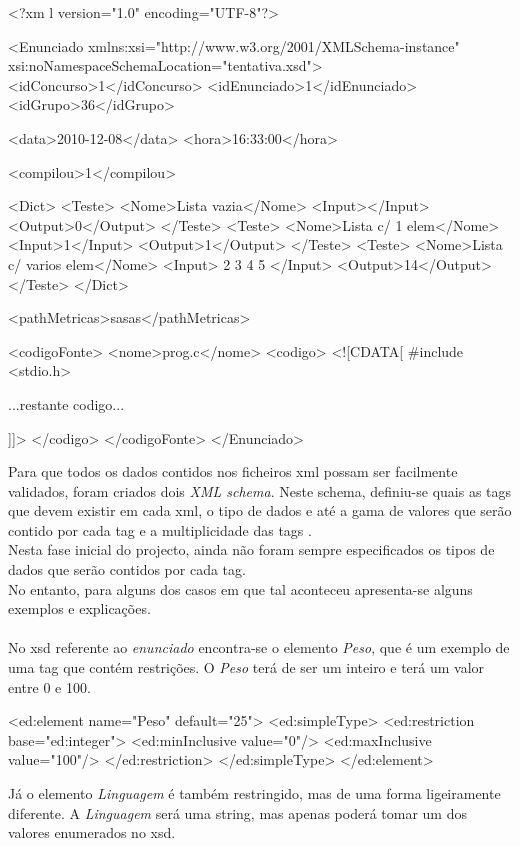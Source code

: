 \begin{myxml}
<?xm l version="1.0" encoding="UTF-8"?>

<Enunciado xmlns:xsi="http://www.w3.org/2001/XMLSchema-instance"
    xsi:noNamespaceSchemaLocation="tentativa.xsd">
    <idConcurso>1</idConcurso>
    <idEnunciado>1</idEnunciado>
    <idGrupo>36</idGrupo>
    
    <data>2010-12-08</data>
    <hora>16:33:00</hora>
    
    <compilou>1</compilou>
    
    <Dict>
        <Teste>
            <Nome>Lista vazia</Nome>
            <Input></Input>
            <Output>0</Output>
        </Teste>
        <Teste>
            <Nome>Lista c/ 1 elem</Nome>
            <Input>1</Input>
            <Output>1</Output>
        </Teste>
        <Teste>
            <Nome>Lista c/ varios elem</Nome>
            <Input> 2 3 4 5 </Input>
            <Output>14</Output>
        </Teste>
    </Dict>

    <pathMetricas>sasas</pathMetricas>
    
    <codigoFonte>
        <nome>prog.c</nome>
        <codigo>
            <![CDATA[
            #include <stdio.h>
            
            ...restante codigo...
            
            ]]>
        </codigo>
    </codigoFonte>
</Enunciado>
\end{myxml}


Para que todos os dados contidos nos ficheiros xml possam ser facilmente validados, foram criados dois \textit{XML schema}.
Neste schema, definiu-se quais as tags que devem existir em cada xml, o tipo de dados e até a gama de valores que serão contido por cada tag e
 a multiplicidade das tags .\\

Nesta fase inicial do projecto, ainda não foram sempre especificados os tipos de dados que serão contidos por cada tag.\\
No entanto, para alguns dos casos em que tal aconteceu apresenta-se alguns exemplos e explicações.\\
\\
No xsd referente ao \textit{enunciado} encontra-se o elemento \textit{Peso}, que é um exemplo de uma tag que contém restrições.
O \textit{Peso} terá de ser um inteiro e terá um valor entre 0 e 100.

\begin{myxml}
<ed:element name="Peso" default="25">
  <ed:simpleType>
    <ed:restriction base="ed:integer">
      <ed:minInclusive value="0"/>
      <ed:maxInclusive value="100"/>
    </ed:restriction>
  </ed:simpleType>
</ed:element>
\end{myxml}
Já o elemento \textit{Linguagem} é também restringido, mas de uma forma ligeiramente diferente. A \textit{Linguagem} será uma string, mas
apenas poderá tomar um dos valores enumerados no xsd.\\

